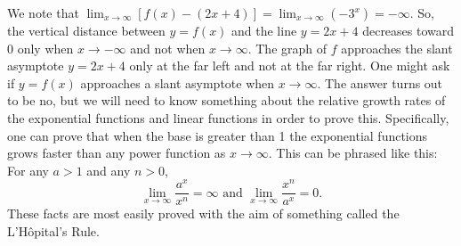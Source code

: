 We note that $\lim_{x\to \infty}[f(x)-(2x+4)]=\lim_{x\to \infty}(-3^x)=-\infty$.
So, the vertical distance between $%
y=f(x)$ and the line $y=2x+4$ decreases toward 0 only when $%
x\to -\infty $ and not when $x\to \infty$. The graph of $f$
approaches the slant asymptote $y=2x+4$ only at the far left and not at the
far right. One might ask if $y=f(x)$ approaches a slant
asymptote when $x\to \infty$. The answer turns out to be no, but we
will need to know something about the relative growth rates of the
exponential functions and linear functions in order to prove this.
Specifically, one can prove that when the base is greater than 1 the
exponential functions grows faster than any power function as $x\to
\infty$. This can be phrased like this: For any $a>1$ and any $n>0$,%
\begin{equation*}
\lim_{x\to \infty}\frac{a^x}{x^n}=\infty \text{ and }%
\lim_{x\to \infty}\frac{x^n}{a^x}=0.
\end{equation*}%
These facts are most easily proved with the aim of something called the L'H\^{o}pital's Rule.